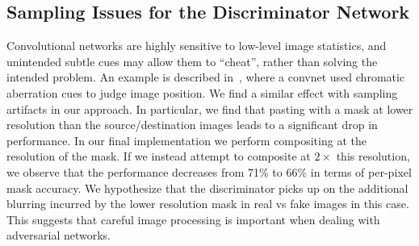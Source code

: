 \documentclass[runningheads]{llncs}
\begin{document}
\subsection{Sampling Issues for the Discriminator Network}\label{sec:sampling_issues}
Convolutional networks are highly sensitive to low-level image statistics, and unintended subtle cues may allow them to ``cheat'', rather than solving the intended problem. An example is described in~\cite{doersch2015unsupervised}, where a convnet used chromatic aberration cues to judge image position. We find a similar effect with sampling artifacts in our approach. In particular, we find that pasting with a mask at lower resolution than the source/destination images leads to a significant drop in performance. In our final implementation we perform compositing at the resolution
of the mask. If we instead attempt to composite at $2 \times$ this resolution, we observe that the performance decreases from 71\% to 66\% in terms of per-pixel mask accuracy. We hypothesize that the discriminator picks up on the additional blurring incurred by the lower resolution mask in real vs fake images in this case.
This suggests that careful image processing is important when dealing with adversarial networks.
\end{document}
